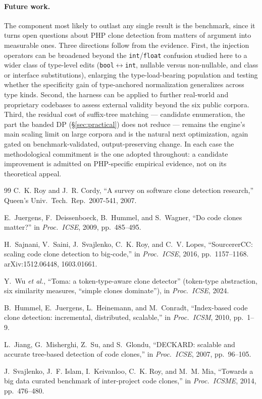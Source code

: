 \documentclass[10pt,a4paper]{article}
\newcounter{prop}[section]
\begin{document}
\paragraph{Future work.} The component most likely to outlast any single result is the benchmark, since
it turns open questions about PHP clone detection from matters of argument into measurable ones. Three
directions follow from the evidence. First, the injection operators can be broadened beyond the
\texttt{int}/\texttt{float} confusion studied here to a wider class of type-level edits
(\texttt{bool}$\leftrightarrow$\texttt{int}, nullable versus non-nullable, and class or interface
substitutions), enlarging the type-load-bearing population and testing whether the specificity gain of
type-anchored normalization generalizes across type kinds. Second, the harness can be applied to
further real-world and proprietary codebases to assess external validity beyond the six public corpora.
Third, the residual cost of suffix-tree matching --- candidate enumeration, the part the banded DP
(\S\ref{sec:practical}) does not reduce --- remains the engine's main scaling limit on large corpora
and is the natural next optimization, again gated on benchmark-validated, output-preserving change. In each case the methodological commitment is the
one adopted throughout: a candidate improvement is admitted on PHP-specific empirical evidence, not on
its theoretical appeal.

\begin{thebibliography}{99}
\small
{} C.~K. Roy and J.~R. Cordy, ``A survey on software clone detection research,''
Queen's Univ.\ Tech.\ Rep.\ 2007-541, 2007.

 E.~Juergens, F.~Deissenboeck, B.~Hummel, and S.~Wagner, ``Do code clones matter?''
in \emph{Proc.\ ICSE}, 2009, pp.~485--495.

 H.~Sajnani, V.~Saini, J.~Svajlenko, C.~K. Roy, and C.~V. Lopes,
``SourcererCC: scaling code clone detection to big-code,'' in \emph{Proc.\ ICSE}, 2016,
pp.~1157--1168. arXiv:1512.06448, 1603.01661.

 Y.~Wu \emph{et al.}, ``Toma: a token-type-aware clone detector'' (token-type
abstraction, six similarity measures, ``simple clones dominate''), in \emph{Proc.\ ICSE}, 2024.

 B.~Hummel, E.~Juergens, L.~Heinemann, and M.~Conradt, ``Index-based code clone
detection: incremental, distributed, scalable,'' in \emph{Proc.\ ICSM}, 2010, pp.~1--9.

 L.~Jiang, G.~Misherghi, Z.~Su, and S.~Glondu, ``DECKARD: scalable and accurate
tree-based detection of code clones,'' in \emph{Proc.\ ICSE}, 2007, pp.~96--105.

 J.~Svajlenko, J.~F. Islam, I.~Keivanloo, C.~K. Roy, and M.~M. Mia,
``Towards a big data curated benchmark of inter-project code clones,'' in \emph{Proc.\ ICSME}, 2014,
pp.~476--480.
\end{thebibliography}
\end{document}
